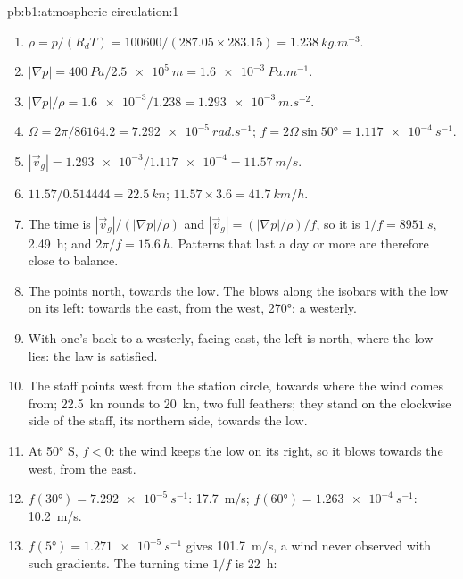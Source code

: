 \begin{solution}{pb:b1:atmospheric-circulation:1}
\begin{enumerate}
  \item $\rho = p/(R_dT) = \num{100600}/(287.05 \times 283.15) =
        \qty{1.238}{kg.m^{-3}}$.
  \item $|\nabla p| = \qty{400}{Pa}/\qty{2.5e5}{m} = \qty{1.6e-3}{Pa.m^{-1}}$.
  \item $|\nabla p|/\rho = \num{1.6e-3}/1.238 = \qty{1.293e-3}{m.s^{-2}}$.
  \item $\Omega = 2\pi/\num{86164.2} = \qty{7.292e-5}{rad.s^{-1}}$;
        $f = 2\Omega\sin\ang{50} = \qty{1.117e-4}{s^{-1}}$.
  \item $|\vec v_g| = \num{1.293e-3}/\num{1.117e-4} = \qty{11.57}{m/s}$.
  \item $11.57/0.514444 = \qty{22.5}{kn}$; $11.57 \times 3.6 = \qty{41.7}{km/h}$.
  \item The time is $|\vec v_g|/(|\nabla p|/\rho)$ and $|\vec v_g| = (|\nabla
        p|/\rho)/f$, so it is $1/f = \qty{8951}{s}$, \qty{2.49}{h}; and $2\pi/f =
        \qty{15.6}{h}$. Patterns that last a day or more are therefore close to
        balance.
  \item The  points north, towards the low. The  blows along the isobars with the low on its left: towards the east,
        from the west,  \ang{270}: a westerly.
  \item With one's back to a westerly, facing east, the left is north, where the low
        lies: the law is satisfied.
  \item The staff points west from the station circle, towards where the wind comes
        from; \qty{22.5}{kn} rounds to \qty{20}{kn}, two full feathers; they stand on
        the clockwise side of the staff, its northern side, towards the low.
  \item At \ang{50} S, $f < 0$: the wind keeps the low on its right, so it blows
        towards the west, from the east.
  \item $f(\ang{30}) = \qty{7.292e-5}{s^{-1}}$: \qty{17.7}{m/s}; $f(\ang{60}) =
        \qty{1.263e-4}{s^{-1}}$: \qty{10.2}{m/s}.
  \item $f(\ang{5}) = \qty{1.271e-5}{s^{-1}}$ gives \qty{101.7}{m/s}, a wind never
        observed with such gradients. The turning time $1/f$ is \qty{22}{h}:

\end{enumerate}
\end{solution}
